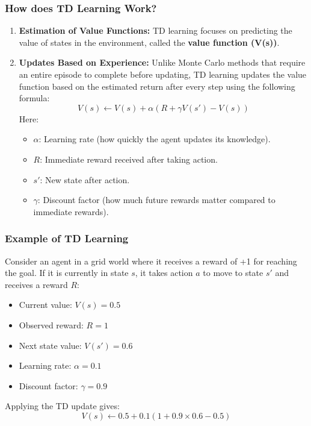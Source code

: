\documentclass[aspectratio=169]{beamer}
\begin{document}
\begin{frame}[fragile]
    \frametitle{How does TD Learning Work?}
    \begin{enumerate}
        \item \textbf{Estimation of Value Functions:} TD learning focuses on predicting the value of states in the environment, called the \textbf{value function (V(s))}.
        \item \textbf{Updates Based on Experience:} 
        Unlike Monte Carlo methods that require an entire episode to complete before updating, TD learning updates the value function based on the estimated return after every step using the following formula:
        \begin{equation}
            V(s) \gets V(s) + \alpha \left( R + \gamma V(s') - V(s) \right)
        \end{equation}
        Here:
        \begin{itemize}
            \item \( \alpha \): Learning rate (how quickly the agent updates its knowledge).
            \item \( R \): Immediate reward received after taking action.
            \item \( s' \): New state after action.
            \item \( \gamma \): Discount factor (how much future rewards matter compared to immediate rewards).
        \end{itemize}
    \end{enumerate}
\end{frame}

\begin{frame}[fragile]
    \frametitle{Example of TD Learning}
    Consider an agent in a grid world where it receives a reward of +1 for reaching the goal. If it is currently in state \( s \), it takes action \( a \) to move to state \( s' \) and receives a reward \( R \):
    \begin{itemize}
        \item Current value: \( V(s) = 0.5 \)
        \item Observed reward: \( R = 1 \)
        \item Next state value: \( V(s') = 0.6 \)
        \item Learning rate: \( \alpha = 0.1 \)
        \item Discount factor: \( \gamma = 0.9 \)
    \end{itemize}
    Applying the TD update gives:
    \begin{equation}
        V(s) \gets 0.5 + 0.1 \left( 1 + 0.9 \times 0.6 - 0.5 \right)
    \end{equation}
\end{frame}
\end{document}
